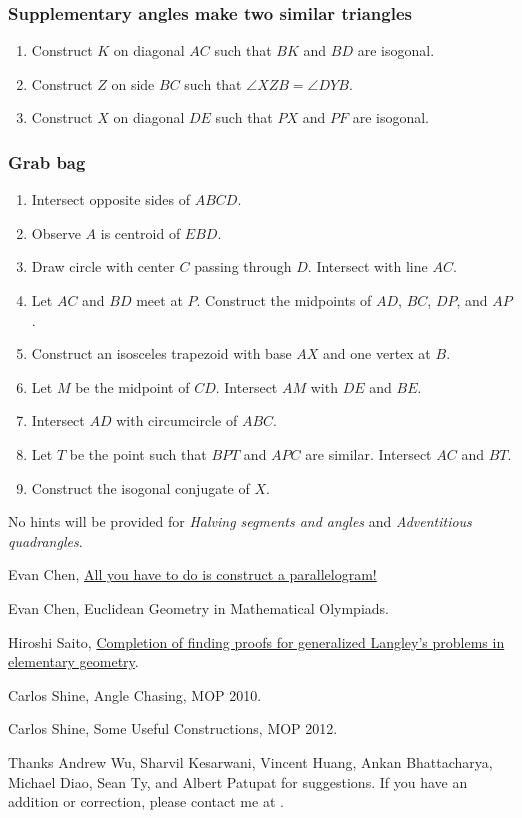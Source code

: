 \documentclass[11pt,paper=letter]{scrartcl}
\begin{document}
\subsubsection*{Supplementary angles make two similar triangles}

\begin{enumerate}
  \item Construct $K$ on diagonal $AC$ such that $BK$ and $BD$ are isogonal.
  \item Construct $Z$ on side $BC$ such that $\angle XZB = \angle DYB$.
  \item Construct $X$ on diagonal $DE$ such that $PX$ and $PF$ are isogonal.
\end{enumerate}

\subsubsection*{Grab bag}

\begin{enumerate}
  \item Intersect opposite sides of $ABCD$.
  \item Observe $A$ is centroid of $EBD$.
  \item Draw circle with center $C$ passing through $D$. Intersect with line $AC$.
  \item Let $AC$ and $BD$ meet at $P$. Construct the midpoints of $AD$, $BC$, $DP$, and $AP$.
  \item Construct an isosceles trapezoid with base $AX$ and one vertex at $B$.
  \item Let $M$ be the midpoint of $CD$. Intersect $AM$ with $DE$ and $BE$.
  \item Intersect $AD$ with circumcircle of $ABC$.
  \item Let $T$ be the point such that $BPT$ and $APC$ are similar. Intersect $AC$ and $BT$.
  \item Construct the isogonal conjugate of $X$.
\end{enumerate}

No hints will be provided for \emph{Halving segments and angles} and \emph{Adventitious quadrangles}.

\begin{thebibliography}{99}

 Evan Chen, \href{http://web.evanchen.cc/handouts/BMC_Parallelograms/BMC_Parallelograms.pdf}{All you have to do is construct a parallelogram!}

 Evan Chen, Euclidean Geometry in Mathematical Olympiads.

 Hiroshi Saito, \href{https://www.gensu.co.jp/saito/challenge/pdf/3circumcenter_d20180609.pdf}{Completion of finding proofs for generalized Langley's problems in
elementary geometry}.

 Carlos Shine, Angle Chasing, MOP 2010.

 Carlos Shine, Some Useful Constructions, MOP 2012.

\end{thebibliography}

Thanks Andrew Wu, Sharvil Kesarwani, Vincent Huang, Ankan Bhattacharya, Michael Diao, Sean Ty, and Albert Patupat for suggestions. If you have an addition or correction, please contact me at .
\end{document}
